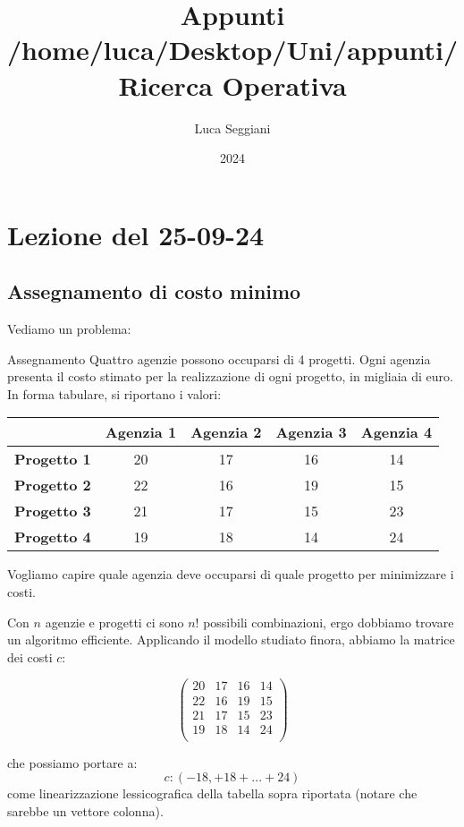 \documentclass[a4paper,11pt]{article}
\title{Appunti /home/luca/Desktop/Uni/appunti/Ricerca Operativa}
\author{Luca Seggiani}
\date{2024}
\begin{document}
\section{Lezione del 25-09-24}

\thispagestyle{empty}
\pagestyle{fancy}

\subsection{Assegnamento di costo minimo}
Vediamo un problema:
\begin{problem}{Assegnamento}
	Quattro agenzie possono occuparsi di 4 progetti.
	Ogni agenzia presenta il costo stimato per la realizzazione di ogni progetto, in migliaia di euro.
	In forma tabulare, si riportano i valori:

	\center {}
	\begin{tabular} { | c | c | c | c | c | }
		\hline
		& \bfseries Agenzia 1 & \bfseries Agenzia 2 & \bfseries Agenzia 3 & \bfseries Agenzia 4 \\
		\hline 
		\bfseries Progetto 1 & 20 & 17 & 16 & 14 \\
		\bfseries Progetto 2 & 22 & 16 & 19 & 15 \\
		\bfseries Progetto 3 & 21 & 17 & 15 & 23 \\ 
		\bfseries Progetto 4 & 19 & 18 & 14 & 24 \\
		\hline
	\end{tabular}

	\par\bigskip
	
	Vogliamo capire quale agenzia deve occuparsi di quale progetto per minimizzare i costi.

\end{problem}

Con $n$ agenzie e progetti ci sono $n!$ possibili combinazioni, ergo dobbiamo trovare un algoritmo efficiente. 
Applicando il modello studiato finora, abbiamo la matrice dei costi $c$:

$$
\begin{pmatrix}
 20 & 17 & 16 & 14 \\
 22 & 16 & 19 & 15 \\
 21 & 17 & 15 & 23 \\
 19 & 18 & 14 & 24 \\
\end{pmatrix}
$$

che possiamo portare a:
$$ c: ( -18, +18 + ... + 24 ) $$
come linearizzazione lessicografica della tabella sopra riportata (notare che sarebbe un vettore colonna).
\end{document}
